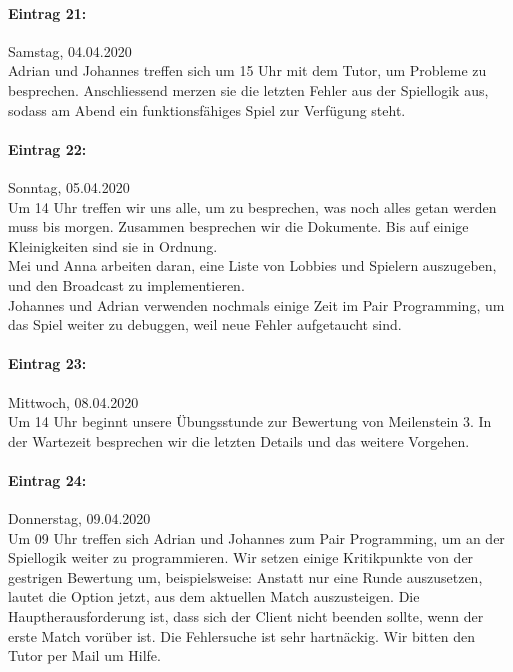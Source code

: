 \documentclass[12pt]{article}
\begin{document}
\paragraph{Eintrag 21:}
Samstag, 04.04.2020\\
Adrian und Johannes treffen sich um 15 Uhr mit dem Tutor, um Probleme zu besprechen. Anschliessend merzen sie die letzten Fehler aus der Spiellogik aus, sodass am Abend ein funktionsf\"ahiges Spiel zur Verf\"ugung steht.

\paragraph{Eintrag 22:}
Sonntag, 05.04.2020\\
Um 14 Uhr treffen wir uns alle, um zu besprechen, was noch alles getan werden muss bis morgen. Zusammen besprechen wir die Dokumente. Bis auf einige Kleinigkeiten sind sie in Ordnung.\\
Mei und Anna arbeiten daran, eine Liste von Lobbies und Spielern auszugeben, und den Broadcast zu implementieren.\\
Johannes und Adrian verwenden nochmals einige Zeit im Pair Programming, um das Spiel weiter zu debuggen, weil neue Fehler aufgetaucht sind.

\paragraph{Eintrag 23:}
Mittwoch, 08.04.2020\\
Um 14 Uhr beginnt unsere \"Ubungsstunde zur Bewertung von Meilenstein 3. In der Wartezeit besprechen wir die letzten Details und das weitere Vorgehen.

\paragraph{Eintrag 24:}
Donnerstag, 09.04.2020\\
Um 09 Uhr treffen sich Adrian und Johannes zum Pair Programming, um an der Spiellogik weiter zu programmieren. Wir setzen einige Kritikpunkte von der gestrigen Bewertung um, beispielsweise: Anstatt nur eine Runde auszusetzen, lautet die Option jetzt, aus dem aktuellen Match auszusteigen. Die Hauptherausforderung ist, dass sich der Client nicht beenden sollte, wenn der erste Match vor\"uber ist. Die Fehlersuche ist sehr hartn\"ackig. Wir bitten den Tutor per Mail um Hilfe.
\end{document}
